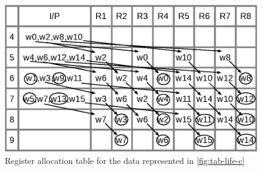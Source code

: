 \documentclass[journal,comsoc]{IEEEtran}
\begin{document}
\begin{figure} 
\centering
 \includegraphics[width=0.95\linewidth]{Diagramas/tab_life_c.eps}
\caption{Register allocation table for the data represented in \ref{fig:tab-life-c}}
\label{fig:tab-aloc-c}
\end{figure}
\end{document}
